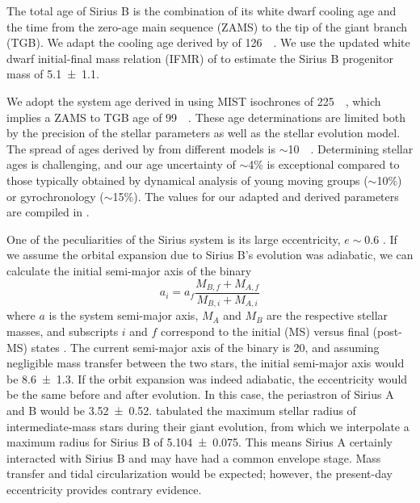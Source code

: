 \documentclass[twocolumn]{aastex631}
\begin{document}
The total age of Sirius B is the combination of its white dwarf cooling age and the time from the zero-age main sequence (ZAMS) to the tip of the giant branch (TGB). We adapt the cooling age derived by \citet[Sec.~8]{bondSiriusSystemIts2017} of \qty{126}{\mega\year}. We use the updated white dwarf initial-final mass relation (IFMR) of \citet{cummingsWhiteDwarfInitialFinal2018} to estimate the Sirius B progenitor mass of \qty{5.1\pm1.1}{\solarmass}.

We adopt the system age derived in \citet{cummingsWhiteDwarfInitialFinal2018} using MIST isochrones of \qty{225}{\mega\year}, which implies a ZAMS to TGB age of \qty{99}{\mega\year}. These age determinations are limited both by the precision of the stellar parameters as well as the stellar evolution model. The spread of ages derived by \citet{cummingsWhiteDwarfInitialFinal2018} from different models is $\sim$\qty{10}{\mega\year}. Determining stellar ages is challenging, and our age uncertainty of $\sim$4\% is exceptional compared to those typically obtained by dynamical analysis of young moving groups ($\sim$10\%) or gyrochronology ($\sim$15\%). The values for our adapted and derived parameters are compiled in .


One of the peculiarities of the Sirius system is its large eccentricity, $e\sim0.6$ \citep{bondSiriusSystemIts2017}. If we assume the orbital expansion due to Sirius B's evolution was adiabatic, we can calculate the initial semi-major axis of the binary
\begin{equation}
    a_i = a_f \frac{M_{B,f} + M_{A,f}}{M_{B,i} + M_{A,i}}
\end{equation}
where $a$ is the system semi-major axis, $M_A$ and $M_B$ are the respective stellar masses, and subscripts $i$ and $f$ correspond to the initial (MS) versus final (post-MS) states \citep{jeansCosmogonicProblemsAssociated1924}. The current semi-major axis of the binary is \qty{20}{\au}, and assuming negligible mass transfer between the two stars, the initial semi-major axis would be \qty{8.6\pm1.3}{\au}. If the orbit expansion was indeed adiabatic, the eccentricity would be the same before and after evolution. In this case, the periastron of Sirius A and B would be \qty{3.52\pm0.52}{\au}. \citet{verasPostmainsequencePlanetarySystem2016} tabulated the maximum stellar radius of intermediate-mass stars during their giant evolution, from which we interpolate a maximum radius for Sirius B of \qty{5.104\pm0.075}{\au}. This means Sirius A certainly interacted with Sirius B and may have had a common envelope stage. Mass transfer and tidal circularization would be expected; however, the present-day eccentricity provides contrary evidence.
\end{document}
